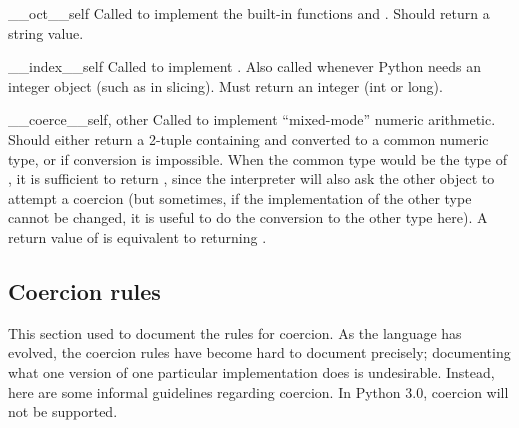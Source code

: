 \begin{methoddesc}{__oct__}{self}
Called to implement the built-in functions
 and
.  Should return a string value.
\end{methoddesc}

\begin{methoddesc}{__index__}{self}
Called to implement .  Also called whenever
Python needs an integer object (such as in slicing).  Must return an
integer (int or long).
\end{methoddesc}

\begin{methoddesc}{__coerce__}{self, other}
Called to implement ``mixed-mode'' numeric arithmetic.  Should either
return a 2-tuple containing  and  converted to
a common numeric type, or  if conversion is impossible.  When
the common type would be the type of , it is sufficient to
return , since the interpreter will also ask the other
object to attempt a coercion (but sometimes, if the implementation of
the other type cannot be changed, it is useful to do the conversion to
the other type here).  A return value of  is
equivalent to returning .
\end{methoddesc}

\subsection{Coercion rules\label{coercion-rules}}

This section used to document the rules for coercion.  As the language
has evolved, the coercion rules have become hard to document
precisely; documenting what one version of one particular
implementation does is undesirable.  Instead, here are some informal
guidelines regarding coercion.  In Python 3.0, coercion will not be
supported.

